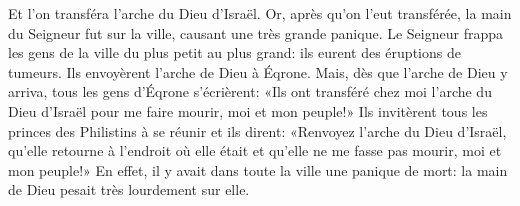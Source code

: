 Et l’on transféra l’arche du Dieu d’Israël.
Or, après qu’on l’eut transférée,
	la main du Seigneur fut sur la ville, causant une très grande panique.
Le Seigneur frappa les gens de la ville du plus petit au plus grand:
	ils eurent des éruptions de tumeurs.
Ils envoyèrent l’arche de Dieu à Éqrone.
Mais, dès que l’arche de Dieu y arriva, tous les gens d’Éqrone s’écrièrent:
	«Ils ont transféré chez moi l’arche du Dieu d’Israël pour me faire mourir,
	moi et mon peuple!»
Ils invitèrent tous les princes des Philistins à se réunir et ils dirent:
	«Renvoyez l’arche du Dieu d’Israël, qu’elle retourne à l’endroit où elle était
	et qu’elle ne me fasse pas mourir, moi et mon peuple!»
En effet, il y avait dans toute la ville une panique de mort:
	la main de Dieu pesait très lourdement sur elle.
